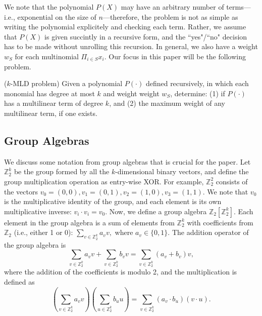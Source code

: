 We note that the polynomial $P(X)$ may have an arbitrary number of terms---i.e., exponential on the size of $n$---therefore, the problem is not as simple as writing the polynomial explicitely and checking each term. Rather, we assume that $P(X)$ is given succintly in a recursive form, and the ``yes"/``no" decision has to be made without unrolling this recursion.
In general, we also have a weight $w_S$ for each multinomial $\Pi_{i\in S} x_i$. Our focus in this paper will be the following problem.


\begin{problem} (\textsc{$k$-MLD} problem)
Given a polynomial $P(\cdot)$ defined recursively,
in which each monomial
has degree at most $k$ and weight weight $w_S$, determine:
(1) if $P(\cdot)$ has a multilinear term of degree $k$, and 
(2) the maximum weight of any multilinear term, if one exists.
\end{problem}

\subsection{Group Algebras}
\label{sec:grpalgebra}
We discuss some notation from group algebras that is crucial for the paper. 
Let $\mathbb{Z}_2^k$ be the group formed by all the $k$-dimensional binary vectors, and define the group multiplication operation as entry-wise XOR. For example, $\mathbb{Z}_2^2$ consists of the vectors $v_0 = (0, 0), v_1 = (0, 1), v_2 = (1, 0), v_3 = (1, 1)$. We note that $v_0$ is the multiplicative identity of the group, and each element is its own multiplicative inverse: $v_i \cdot v_i = v_0$. Now, we define a group algebra $\mathbb{Z}_2[\mathbb{Z}_2^k]$. Each element in the group algebra is a sum of elements from $\mathbb{Z}_2^k$ with coefficients from $\mathbb{Z}_2$ (i.e., either 1 or 0):
$
\sum_{v\in \mathbb{Z}_2^k} a_v v,
$
where $a_v \in \{0,1\}$. The addition operator of the group algebra is
{\scriptsize
$$
\sum_{v\in \mathbb{Z}_2^k} a_v v + \sum_{v\in \mathbb{Z}_2^k} b_v v = \sum_{v\in \mathbb{Z}_2^k} (a_v + b_v) v,
$$}
where the addition of the coefficients is modulo 2, and the multiplication is defined as
{\scriptsize
$$
\left(\sum_{v\in \mathbb{Z}_2^k} a_v v\right)\left(\sum_{u\in \mathbb{Z}_2^k} b_u u\right) = \sum_{v\in \mathbb{Z}_2^k} (a_v \cdot b_u) (v\cdot u).
$$}


